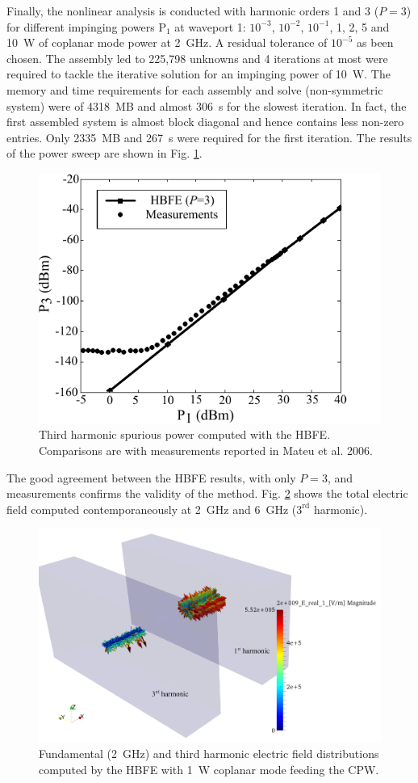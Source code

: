 Finally, the nonlinear analysis is conducted with harmonic orders 1 and 3 ($P=3$) for different impinging powers $\mathrm{P}_1$ at waveport 1: $10^{-3}$, $10^{-2}$, $10^{-1}$, 1, 2, 5 and 10~W of coplanar mode power at 2~GHz. A residual tolerance of $10^{-5}$ as been chosen. The assembly led to 225,798 unknowns and 4 iterations at most were required to tackle the iterative solution for an impinging power of 10~W. The memory and time requirements for each assembly and solve (non-symmetric system) were of 4318~MB and almost 306~s for the slowest iteration. In fact, the first assembled system is almost block diagonal and hence contains less non-zero entries. Only 2335~MB and 267~s were required for the first iteration. The results of the power sweep are shown in Fig. \ref{fig:P3}.
%
\begin{figure}[ht!]
\centering
\includegraphics[width=12cm]{P3}
\caption{Third harmonic spurious power computed with the HBFE. Comparisons are with measurements reported in Mateu et al. 2006.}
\label{fig:P3}
\end{figure}
%
The good agreement between the HBFE results, with only $P=3$, and measurements confirms the validity of the method. Fig. \ref{fig:FieldGlyph} shows the total electric field computed contemporaneously at 2~GHz and 6~GHz ($3^\mathrm{rd}$ harmonic).


\begin{figure}[ht!]
\centering
\includegraphics[width=14.4cm]{FieldGlyph}
\caption{Fundamental (2~GHz) and third harmonic electric field distributions computed  by the HBFE with 1~W coplanar mode feeding the CPW.}
\label{fig:FieldGlyph}
\end{figure}

